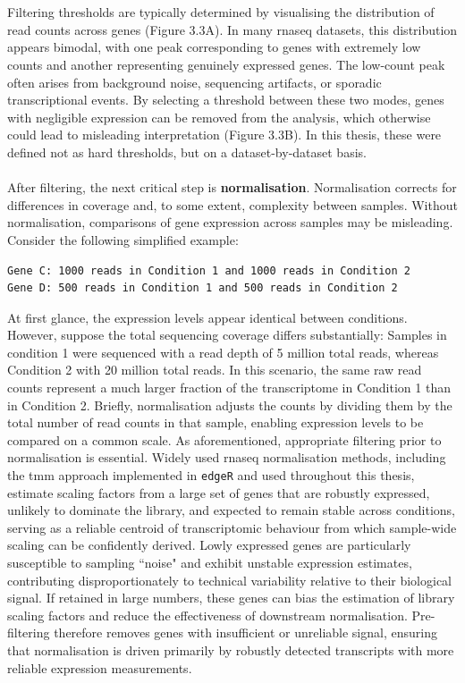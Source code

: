 \\
\\
Filtering thresholds are typically determined by visualising the distribution of read counts across genes (Figure 3.3A). In many \gls{rnaseq} datasets, this distribution appears bimodal, with one peak corresponding to genes with extremely low counts and another representing genuinely expressed genes. The low-count peak often arises from background noise, sequencing artifacts, or sporadic transcriptional events. By selecting a threshold between these two modes, genes with negligible expression can be removed from the analysis, which otherwise could lead to misleading interpretation (Figure 3.3B). In this thesis, these were defined not as hard thresholds, but on a dataset-by-dataset basis.
\\
\\
After filtering, the next critical step is \textbf{normalisation}. Normalisation corrects for differences in coverage and, to some extent, complexity between samples. Without normalisation, comparisons of gene expression across samples may be misleading.
\\
\linebreak
\noindent
Consider the following simplified example:
\begin{verbatim}
Gene C: 1000 reads in Condition 1 and 1000 reads in Condition 2
Gene D: 500 reads in Condition 1 and 500 reads in Condition 2
\end{verbatim}
At first glance, the expression levels appear identical between conditions. However, suppose the total sequencing coverage differs substantially: Samples in condition 1 were sequenced with a read depth of 5 million total reads, whereas Condition 2 with 20 million total reads. In this scenario, the same raw read counts represent a much larger fraction of the transcriptome in Condition 1 than in Condition 2. Briefly, normalisation adjusts the counts by dividing them by the total number of read counts in that sample, enabling expression levels to be compared on a common scale. As aforementioned, appropriate filtering prior to normalisation is essential. Widely used \gls{rnaseq} normalisation methods, including the \gls{tmm} approach implemented in \texttt{edgeR}\cite{robinson_edger_2010} and used throughout this thesis, estimate scaling factors from a large set of genes that are robustly expressed, unlikely to dominate the library, and expected to remain stable across conditions, serving as a reliable centroid of transcriptomic behaviour from which sample-wide scaling can be confidently derived\cite{robinson_edger_2010,robinson_scaling_2010}. Lowly expressed genes are particularly susceptible to sampling ``noise" and exhibit unstable expression estimates, contributing disproportionately to technical variability relative to their biological signal\cite{robinson_edger_2010,robinson_scaling_2010}. If retained in large numbers, these genes can bias the estimation of library scaling factors and reduce the effectiveness of downstream normalisation\cite{robinson_edger_2010,robinson_scaling_2010}. Pre-filtering therefore removes genes with insufficient or unreliable signal, ensuring that normalisation is driven primarily by robustly detected transcripts with more reliable expression measurements\cite{robinson_edger_2010,robinson_scaling_2010}.
